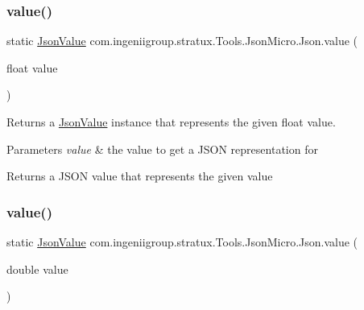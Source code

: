 \subsubsection{\texorpdfstring{value()}{value()}\hspace{0.1cm}{\footnotesize\ttfamily [3/6]}}
{\footnotesize\ttfamily static \hyperlink{classcom_1_1ingeniigroup_1_1stratux_1_1_tools_1_1_json_micro_1_1_json_value}{Json\+Value} com.\+ingeniigroup.\+stratux.\+Tools.\+Json\+Micro.\+Json.\+value (\begin{DoxyParamCaption}\item[{float}]{value }\end{DoxyParamCaption})\hspace{0.3cm}{\ttfamily [static]}}

Returns a \hyperlink{classcom_1_1ingeniigroup_1_1stratux_1_1_tools_1_1_json_micro_1_1_json_value}{Json\+Value} instance that represents the given {\ttfamily float} value.


\begin{DoxyParams}{Parameters}
{\em value} & the value to get a J\+S\+ON representation for \\
\hline
\end{DoxyParams}
\begin{DoxyReturn}{Returns}
a J\+S\+ON value that represents the given value 
\end{DoxyReturn}
\mbox{\label{classcom_1_1ingeniigroup_1_1stratux_1_1_tools_1_1_json_micro_1_1_json_a7029915af0f1d495bdb9b9c0fc1eacd0}} 
\subsubsection{\texorpdfstring{value()}{value()}\hspace{0.1cm}{\footnotesize\ttfamily [4/6]}}
{\footnotesize\ttfamily static \hyperlink{classcom_1_1ingeniigroup_1_1stratux_1_1_tools_1_1_json_micro_1_1_json_value}{Json\+Value} com.\+ingeniigroup.\+stratux.\+Tools.\+Json\+Micro.\+Json.\+value (\begin{DoxyParamCaption}\item[{double}]{value }\end{DoxyParamCaption})\hspace{0.3cm}{\ttfamily [static]}}

